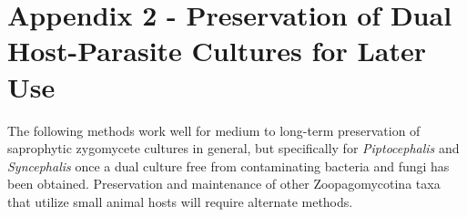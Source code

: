 \documentclass[]{book}
\begin{document}
\hypertarget{appendix-2---preservation-of-dual-host-parasite-cultures-for-later-use}{%
\section{Appendix 2 - Preservation of Dual Host-Parasite Cultures for Later Use}\label{appendix-2---preservation-of-dual-host-parasite-cultures-for-later-use}}

The following methods work well for medium to long-term preservation of saprophytic zygomycete cultures in general, but specifically for \emph{Piptocephalis} and \emph{Syncephalis} once a dual culture free from contaminating bacteria and fungi has been obtained. Preservation and maintenance of other Zoopagomycotina taxa that utilize small animal hosts will require alternate methods.
\end{document}
